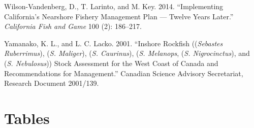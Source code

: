 \documentclass[11pt,
  english,
  a4paper,
]{article}
\begin{document}
\leavevmode\hypertarget{ref-Wilson-Vandenbergetal_2014}{}%
Wilson-Vandenberg, D., T. Larinto, and M. Key. 2014. ``Implementing California's Nearshore Fishery Management Plan --- Twelve Years Later.'' \emph{California Fish and Game} 100 (2): 186--217.

\leavevmode\hypertarget{ref-YamanakaandLacko_rockfish_2001}{}%
Yamanako, K. L., and L. C. Lacko. 2001. ``Inshore Rockfish ((\emph{Sebastes Ruberrimus}), (\emph{S. Maliger}), (\emph{S. Caurinus}), (\emph{S. Melanops}, (\emph{S. Nigrocinctus}), and (\emph{S. Nebulosus})) Stock Assessment for the West Coast of Canada and Recommendations for Management.'' Canadian Science Advisory Secretariat, Research Document 2001/139.

\leavevmode\tagmcend\tagstructend

\clearpage


\hypertarget{tables}{%
\section{Tables}\label{tables}}

\leavevmode\tagmcend\tagstructend



\newpage

\begingroup\fontsize{10}{12}\selectfont
\begingroup\fontsize{10}{12}\selectfont
\end{document}
